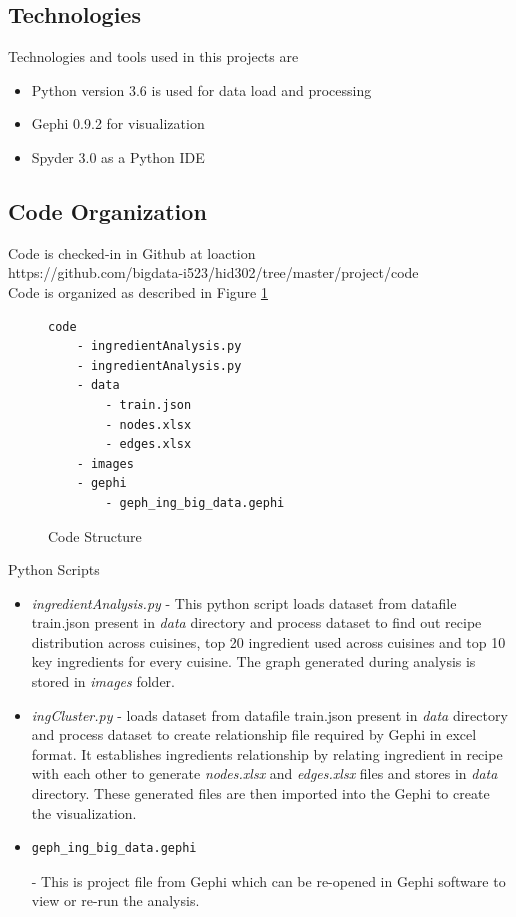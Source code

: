 \documentclass[sigconf]{acmart}
\begin{document}
\subsection{Technologies}
Technologies and tools used in this projects are
\begin{itemize}
\item Python version 3.6 is used for data load and processing
\item Gephi 0.9.2 for visualization
\item Spyder 3.0 as a Python IDE
\end{itemize}

\subsection{Code Organization}
Code is checked-in in Github at loaction \\
https://github.com/bigdata-i523/hid302/tree/master/project/code \\
Code is organized as described in Figure \ref{c:code-structure}
\begin{figure}[htb]
\begin{verbatim}
code
    - ingredientAnalysis.py
    - ingredientAnalysis.py
    - data
        - train.json
        - nodes.xlsx
        - edges.xlsx
    - images
    - gephi
        - geph_ing_big_data.gephi
\end{verbatim}
\caption{Code Structure}\label{c:code-structure}
\end{figure}

Python Scripts
\begin{itemize}
\item \emph{ingredientAnalysis.py} - This python script loads dataset from datafile train.json present in \emph{data} directory and process dataset to find out recipe distribution across cuisines, top 20 ingredient used across cuisines and top 10 key ingredients for every cuisine. The graph generated during analysis is stored in \emph{images} folder.
\item \emph{ingCluster.py} - loads dataset from datafile train.json present in \emph{data} directory and process dataset to create relationship file required by Gephi in excel format. It establishes ingredients relationship by relating ingredient in recipe with each other to generate \emph{nodes.xlsx} and \emph{edges.xlsx} files and stores in \emph{data} directory. These generated files are then imported into the Gephi to create the visualization.
\item \begin{verbatim}geph_ing_big_data.gephi\end{verbatim} - This is project file from Gephi which can be re-opened in Gephi software to view or re-run the analysis.
\end{itemize}
\end{document}
